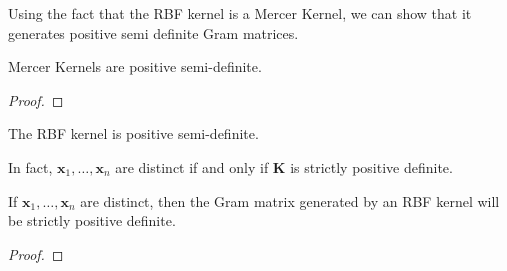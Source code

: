 %    
%    
%    
%
%
%
%

Using the fact that the RBF kernel is a Mercer Kernel, we can show that it generates positive semi definite Gram matrices.
\begin{lemma}
    Mercer Kernels are positive semi-definite.
\end{lemma}
\begin{proof}

\end{proof}

\begin{corollary}\label{corr:rbf-psd}
    The RBF kernel is positive semi-definite.
\end{corollary}

In fact, $\mathbf{x}_1, \ldots, \mathbf{x}_n$ are distinct if and only if $\mathbf{K}$ is strictly positive definite. 

\begin{lemma}\label{lem:rbf-pd}
    If $\mathbf{x}_1, \ldots, \mathbf{x}_n$ are distinct, then the Gram matrix generated by an RBF kernel will be strictly positive definite.
\end{lemma}
\begin{proof}

\end{proof}


